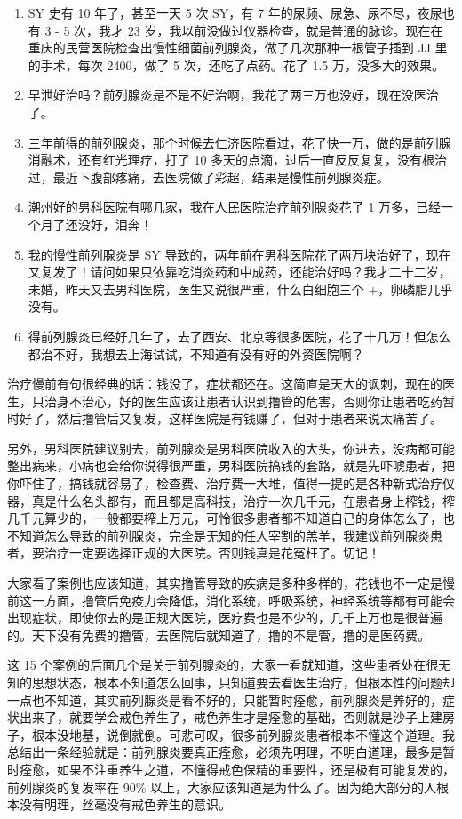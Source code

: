 \documentclass[fontset=founder]{ctexart}
\begin{document}
\begin{enumerate}
    \item SY 史有 10 年了，甚至一天 5 次 SY，有 7 年的尿频、尿急、尿不尽，夜尿也有 3 - 5 次，我才 23 岁，我以前没做过仪器检查，就是普通的脉诊。现在在重庆的民营医院检查出慢性细菌前列腺炎，做了几次那种一根管子插到 JJ 里的手术，每次 2400，做了 5 次，还吃了点药。花了 1.5 万，没多大的效果。
    \item 早泄好治吗？前列腺炎是不是不好治啊，我花了两三万也没好，现在没医治了。
    \item 三年前得的前列腺炎，那个时候去仁济医院看过，花了快一万，做的是前列腺消融术，还有红光理疗，打了 10 多天的点滴，过后一直反反复复，没有根治过，最近下腹部疼痛，去医院做了彩超，结果是慢性前列腺炎症。
    \item 潮州好的男科医院有哪几家，我在人民医院治疗前列腺炎花了 1 万多，已经一个月了还没好，泪奔！
    \item 我的慢性前列腺炎是 SY 导致的，两年前在男科医院花了两万块治好了，现在又复发了！请问如果只依靠吃消炎药和中成药，还能治好吗？我才二十二岁，未婚，昨天又去男科医院，医生又说很严重，什么白细胞三个 +，卵磷脂几乎没有。
    \item 得前列腺炎已经好几年了，去了西安、北京等很多医院，花了十几万！但怎么都治不好，我想去上海试试，不知道有没有好的外资医院啊？
\end{enumerate}

治疗慢前有句很经典的话：钱没了，症状都还在。这简直是天大的讽刺，现在的医生，只治身不治心，好的医生应该让患者认识到撸管的危害，否则你让患者吃药暂时好了，然后撸管后又复发，这样医院是有钱赚了，但对于患者来说太痛苦了。

另外，男科医院建议别去，前列腺炎是男科医院收入的大头，你进去，没病都可能整出病来，小病也会给你说得很严重，男科医院搞钱的套路，就是先吓唬患者，把你吓住了，搞钱就容易了，检查费、治疗费一大堆，值得一提的是各种新式治疗仪器，真是什么名头都有，而且都是高科技，治疗一次几千元，在患者身上榨钱，榨几千元算少的，一般都要榨上万元，可怜很多患者都不知道自己的身体怎么了，也不知道怎么导致的前列腺炎，完全是无知的任人宰割的羔羊，我建议前列腺炎患者，要治疗一定要选择正规的大医院。否则钱真是花冤枉了。切记！

大家看了案例也应该知道，其实撸管导致的疾病是多种多样的，花钱也不一定是慢前这一方面，撸管后免疫力会降低，消化系统，呼吸系统，神经系统等都有可能会出现症状，即使你去的是正规大医院，医疗费也是不少的，几千上万也是很普遍的。天下没有免费的撸管，去医院后就知道了，撸的不是管，撸的是医药费。

这 15 个案例的后面几个是关于前列腺炎的，大家一看就知道，这些患者处在很无知的思想状态，根本不知道怎么回事，只知道要去看医生治疗，但根本性的问题却一点也不知道，其实前列腺炎是看不好的，只能暂时痊愈，前列腺炎是养好的，症状出来了，就要学会戒色养生了，戒色养生才是痊愈的基础，否则就是沙子上建房子，根本没地基，说倒就倒。可悲可叹，很多前列腺炎患者根本不懂这个道理。我总结出一条经验就是：前列腺炎要真正痊愈，必须先明理，不明白道理，最多是暂时痊愈，如果不注重养生之道，不懂得戒色保精的重要性，还是极有可能复发的，前列腺炎的复发率在 90\% 以上，大家应该知道是为什么了。因为绝大部分的人根本没有明理，丝毫没有戒色养生的意识。
\end{document}
